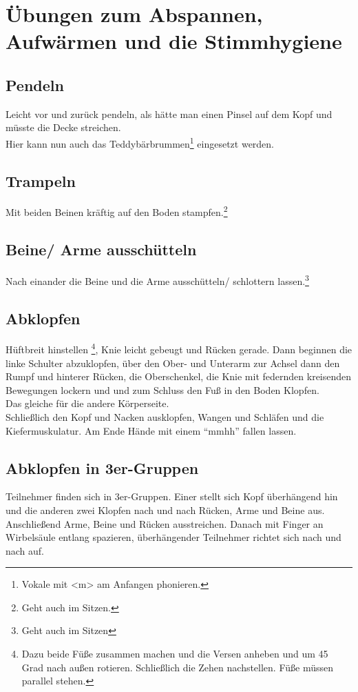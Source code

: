 \documentclass[ngerman, a4paper, twoside]{scrbook}%
\begin{document}
	\chapter{Übungen zum Abspannen, Aufwärmen und die Stimmhygiene}


	\section{Pendeln}
	Leicht vor und zurück pendeln, als hätte man einen Pinsel auf dem Kopf und müsste die Decke streichen.\\
	Hier kann nun auch das Teddybärbrummen\footnote{Vokale mit <m> am Anfangen phonieren.} eingesetzt werden.

	\section{Trampeln}
	Mit beiden Beinen kräftig auf den Boden stampfen.\footnote{Geht auch im Sitzen.}

	\section{Beine/ Arme ausschütteln}
	Nach einander die Beine und die Arme ausschütteln/ schlottern lassen.\footnote{Geht auch im Sitzen}

	\section{Abklopfen}
	Hüftbreit hinstellen \footnote{Dazu beide Füße zusammen machen und die Versen anheben und um 45 Grad nach außen rotieren. Schließlich die Zehen nachstellen. Füße müssen parallel stehen.}, Knie leicht gebeugt und Rücken gerade. Dann beginnen die linke Schulter abzuklopfen, über den Ober- und Unterarm zur Achsel dann den Rumpf und hinterer Rücken, die Oberschenkel, die Knie mit federnden kreisenden Bewegungen lockern und und zum Schluss den Fuß in den Boden Klopfen.\\
	Das gleiche für die andere Körperseite.\\
	Schließlich den Kopf und Nacken ausklopfen, Wangen und Schläfen und die Kiefermuskulatur.
	Am Ende Hände mit einem "`mmhh"' fallen lassen.

	\section{Abklopfen in 3er-Gruppen}
	Teilnehmer finden sich in 3er-Gruppen. Einer stellt sich Kopf überhängend hin und die anderen zwei Klopfen nach und nach Rücken, Arme und Beine aus. Anschließend Arme, Beine und Rücken ausstreichen. Danach mit Finger an Wirbelsäule entlang spazieren, überhängender Teilnehmer richtet sich nach und nach auf.
\end{document}
